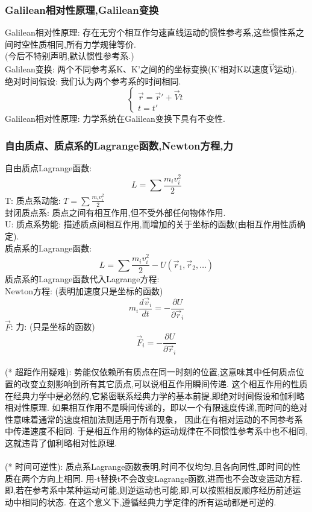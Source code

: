 \documentclass{article}
\begin{document}
\subsubsection{Galilean相对性原理,Galilean变换}
Galilean相对性原理: 存在无穷个相互作匀速直线运动的惯性参考系,这些惯性系之间时空性质相同,所有力学规律等价.\\
(今后不特别声明,默认惯性参考系.)\\
Galilean变换: 两个不同参考系K、K'之间的的坐标变换(K'相对K以速度$\vec V$运动).\\
绝对时间假设: 我们认为两个参考系的时间相同.
\begin{displaymath}
    \left\{ \begin{array}{ll}
    \vec r = \vec r' + \vec V t\\
    t = t'
    \end{array} \right.
\end{displaymath}
Galilean相对性原理: 力学系统在Galilean变换下具有不变性.


\subsubsection{自由质点、质点系的Lagrange函数,Newton方程,力}
自由质点Lagrange函数:
\[L = \sum \frac{m_{i}v_{i}^{2}}{2}\]
T: 质点系动能: $T = \sum \frac{m_{i}v_{i}^{2}}{2}$\\
封闭质点系: 质点之间有相互作用,但不受外部任何物体作用.\\
U: 质点系势能: 描述质点间相互作用,而增加的关于坐标的函数(由相互作用性质确定).\\
质点系的Lagrange函数:
\[L = \sum \frac{m_{i}v_{i}^{2}}{2} - U(\vec r_{1}, \vec r_{2}, \dots)\]
质点系的Lagrange函数代入Lagrange方程:\\
Newton方程: \quad(表明加速度只是坐标的函数)
\[m_{i} \frac{d\vec v_{i}}{dt} = - \frac{\partial U}{\partial \vec r_{i}}\]
$\vec F$: 力: \quad(只是坐标的函数)
\[\vec F_{i} = - \frac{\partial U}{\partial \vec r_{i}}\]
\\
(* 超距作用疑难):
势能仅依赖所有质点在同一时刻的位置,这意味其中任何质点位置的改变立刻影响到所有其它质点,可以说相互作用瞬间传递.
这个相互作用的性质在经典力学中是必然的,它紧密联系经典力学的基本前提,即绝对时间假设和伽利略相对性原理.
如果相互作用不是瞬间传递的，即以一个有限速度传递,而时间的绝对性意味着通常的速度相加法则适用于所有现象，
因此在有相对运动的不同参考系中传递速度不相同.
于是相互作用的物体的运动规律在不同惯性参考系中也不相同,这就违背了伽利略相对性原理.\\
\\
(* 时间可逆性):
质点系Lagrange函数表明,时间不仅均匀,且各向同性,即时间的性质在两个方向上相同.
用-t替换t不会改变Lagrange函数,进而也不会改变运动方程.
即,若在参考系中某种运动可能,则逆运动也可能,即,可以按照相反顺序经历前述运动中相同的状态.
在这个意义下,遵循经典力学定律的所有运动都是可逆的.\\
\end{document}
